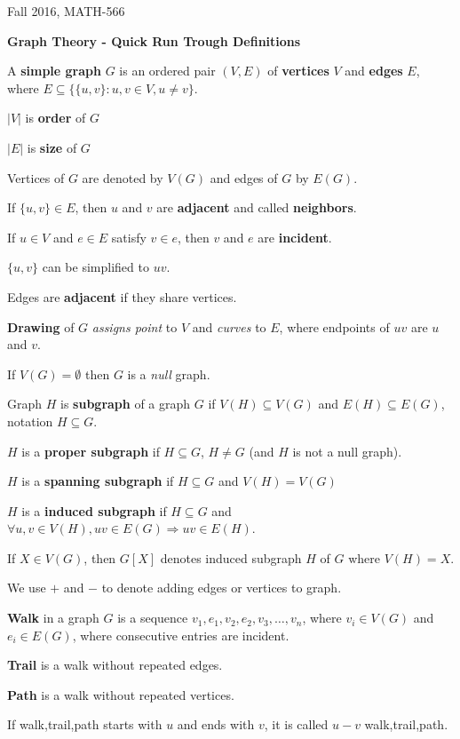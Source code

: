 \documentclass[11pt]{article}
\begin{document}
Fall  2016, MATH-566

\centerline{{\Large \textbf{Graph Theory - Quick Run Trough Definitions}}}



A \textbf{simple graph} $G$ is an ordered pair $(V, E)$ of \textbf{vertices} $V$ and
\textbf{edges} $E$, where $E \subseteq \{ \{u,v\}: u,v \in V, u \neq v  \}$.

$|V|$ is \textbf{order} of $G$

$|E|$ is \textbf{size} of $G$

Vertices of $G$ are denoted by $V(G)$ and edges of $G$ by $E(G)$.

If $\{u,v\} \in E$, then $u$ and $v$ are \textbf{adjacent} and called \textbf{neighbors}.

If $u \in V$ and $e \in E$ satisfy $v \in e$, then $v$ and $e$ are \textbf{incident}. 

$\{u,v\}$ can be simplified to $uv$.

Edges are \textbf{adjacent} if they share vertices.

\textbf{Drawing} of $G$ \emph{assigns point} to $V$ and \emph{curves} to $E$, where endpoints of $uv$ are $u$ and $v$.

If $V(G) = \emptyset$ then $G$ is a \emph{null} graph.

Graph $H$ is \textbf{subgraph} of  a graph $G$ if $V(H) \subseteq V(G)$ and $E(H) \subseteq E(G)$, notation $H \subseteq G$.

$H$ is a \textbf{proper subgraph} if $H \subseteq G$, $H \neq G$ (and $H$ is not a null graph).

$H$ is a \textbf{spanning subgraph} if $H \subseteq G$ and $V(H) = V(G)$

$H$ is a \textbf{induced subgraph} if $H \subseteq G$ and $\forall u,v \in V(H), uv \in E(G) \Rightarrow uv \in E(H)$.

If $X \in V(G)$, then $G[X]$ denotes induced subgraph $H$ of $G$ where $V(H) = X$.

We use $+$ and $-$ to denote adding edges or vertices to graph.

\textbf{Walk} in a graph $G$ is a sequence $v_1,e_1,v_2,e_2,v_3,\ldots,v_n$, where $v_i \in V(G)$ and $e_i \in E(G)$, where consecutive entries are incident.

\textbf{Trail} is a walk without repeated edges.

\textbf{Path} is a walk without repeated vertices.

If walk,trail,path starts with $u$ and ends with $v$, it is called $u-v$ walk,trail,path.
\end{document}
